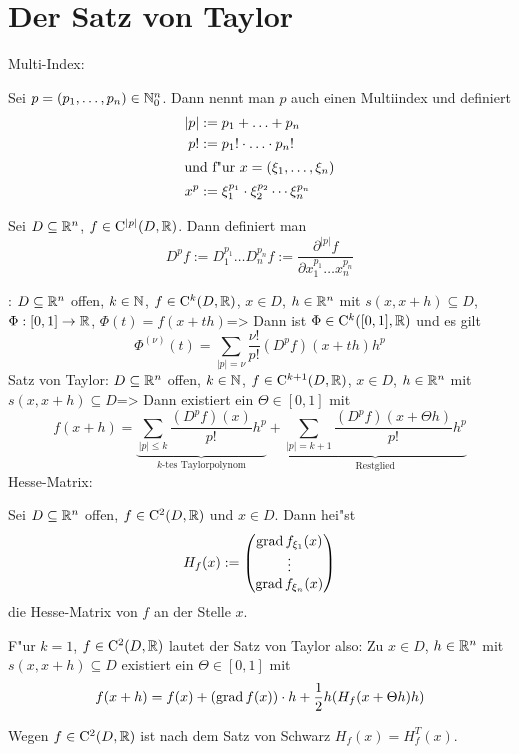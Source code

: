 \section{Der Satz von Taylor}
\lesserdefinition Multi-Index:{
  Sei $p=(p_1,\ldots,p_n)\in\mathbb N_0^n$. Dann nennt man $p$ auch einen
  Multiindex und definiert
  \begin{align*}
    |p|&:=p_1+\ldots+p_n \\
    p!&:=p_1!\cdot\ldots\cdot p_n! \\
  \intertext{und f"ur $x=(\xi_1,\ldots,\xi_n)$}
    x^p&:=\xi_1^{p_1}\cdot\xi_2^{p_2}\cdots\xi_n^{p_n}
    \end{align*}
  
  Sei $D\subseteq\mathbb R^n$, $f\in{\rm C}^{|p|}(D,\mathbb R)$. Dann definiert man
  \[D^pf:=D^{p_1}_1 \ldots D^{p_n}_n f:=
      \frac{\partial^{|p|} f}{\partial x_1^{p_1} \ldots x_n^{p_n}}
    \]
}
\theorem:
  $D\subseteq\mathbb R^n$ offen, $k\in\mathbb N$, $f\in{\rm C}^k(D,\mathbb R)$,
  $x\in D$, $h\in\mathbb R^n$ mit $s(x,x+h)\subseteq D$,
  $\Phi:[0,1]\to\mathbb R$, $\Phi(t)=f(x+th)$=>{
  Dann ist $\Phi\in{\rm C}^k([0,1],\mathbb R)$ und es gilt
  \[\Phi^{(\nu)}(t)= \sum_{|p|=\nu} \frac{\nu!}{p!} (D^pf)(x+th)h^p
    \]
  }
\theorem Satz von Taylor:
  $D\subseteq\mathbb R^n$ offen, $k\in\mathbb N$, $f\in{\rm C}^{k+1}(D,\mathbb R)$,
  $x\in D$, $h\in\mathbb R^n$ mit $s(x,x+h)\subseteq D$=>{
  Dann existiert ein $\Theta\in[0,1]$ mit
  \[f(x+h)=
      \underbrace{
        \sum_{|p|\leq k} \frac{(D^pf)(x)}{p!}h^p
      }_{
        k\text{-tes Taylorpolynom}
      }
      +
      \underbrace{
        \sum_{|p|=k+1} \frac{(D^pf)(x+\Theta h)}{p!}h^p
      }_{
        \text{Restglied}
      }
    \]
  }
 Hesse-Matrix:{
  Sei $D\subseteq\mathbb R^n$ offen, $f\in{\rm C}^2(D,\mathbb R)$ und 
  $x\in D$. Dann hei"st
  \[H_f(x):=\begin{pmatrix}
      \operatorname{grad} f_{\xi_1}(x) \\
      \vdots \\
      \operatorname{grad} f_{\xi_n}(x) \\
      \end{pmatrix}
    \]
  die Hesse-Matrix von $f$ an der Stelle $x$.
  
  F"ur $k=1$, $f\in{\rm C}^2(D,\mathbb R)$ lautet der Satz von Taylor also:
  Zu $x\in D$, $h\in\mathbb R^n$ mit $s(x,x+h)\subseteq D$ existiert
  ein $\Theta\in[0,1]$ mit
  \[f(x+h)=f(x)+(\operatorname{grad} f(x))\cdot h + \frac 1 2 h (H_f(x+\Theta h) h)
    \]
  
  Wegen $f\in{\rm C}^2(D,\mathbb R)$ ist nach dem Satz von Schwarz
  $H_f(x)=H_f^T(x)$.
  }
